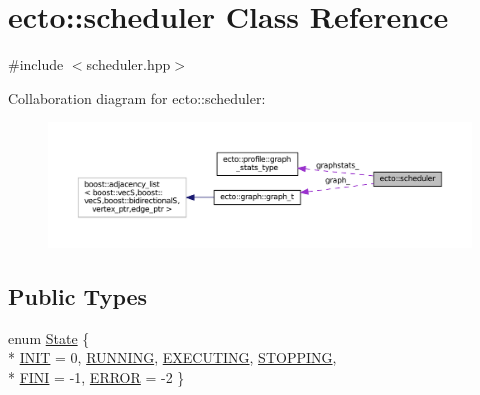 \hypertarget{classecto_1_1scheduler}{}\section{ecto\+:\+:scheduler Class Reference}
\label{classecto_1_1scheduler}


{\ttfamily \#include $<$scheduler.\+hpp$>$}



Collaboration diagram for ecto\+:\+:scheduler\+:\nopagebreak
\begin{figure}[H]
\begin{center}
\leavevmode
\includegraphics[width=350pt]{classecto_1_1scheduler__coll__graph}
\end{center}
\end{figure}
\subsection*{Public Types}
\begin{DoxyCompactItemize}
\item 
enum \hyperlink{classecto_1_1scheduler_a6b063d1c4bb9dad58d7ace61946b1200}{State} \{ \\*
\hyperlink{classecto_1_1scheduler_a6b063d1c4bb9dad58d7ace61946b1200a347092c6b9c4bbc7084bfa04d9ffb57f}{I\+N\+I\+T} = 0, 
\hyperlink{classecto_1_1scheduler_a6b063d1c4bb9dad58d7ace61946b1200aef190614c39d85b915b9ff2225eacf02}{R\+U\+N\+N\+I\+N\+G}, 
\hyperlink{classecto_1_1scheduler_a6b063d1c4bb9dad58d7ace61946b1200a3e140c949a41686e2e0481d13e89c010}{E\+X\+E\+C\+U\+T\+I\+N\+G}, 
\hyperlink{classecto_1_1scheduler_a6b063d1c4bb9dad58d7ace61946b1200a0cf2ac365020f8cd0a6860a3983a0dad}{S\+T\+O\+P\+P\+I\+N\+G}, 
\\*
\hyperlink{classecto_1_1scheduler_a6b063d1c4bb9dad58d7ace61946b1200aa9b97654759582b6e92fbc17a31623bd}{F\+I\+N\+I} = -\/1, 
\hyperlink{classecto_1_1scheduler_a6b063d1c4bb9dad58d7ace61946b1200a45aebc05bdc20659645ad6e1729db520}{E\+R\+R\+O\+R} = -\/2
 \}
\end{DoxyCompactItemize}
